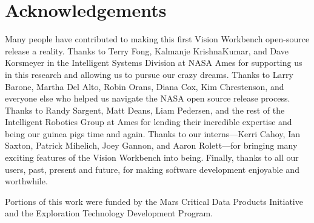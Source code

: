 \chapter*{Acknowledgements}

Many people have contributed to making this first Vision Workbench
open-source release a reality.  Thanks to Terry Fong, Kalmanje
KrishnaKumar, and Dave Korsmeyer in the Intelligent Systems Division
at NASA Ames for supporting us in this research and allowing us to
pursue our crazy dreams.  Thanks to Larry Barone, Martha Del Alto,
Robin Orans, Diana Cox, Kim Chrestenson, and everyone else who helped us navigate the
NASA open source release process.  Thanks to Randy Sargent, Matt
Deans, Liam Pedersen, and the rest of the Intelligent Robotics Group
at Ames for lending their incredible expertise and being our guinea
pigs time and again.  Thanks to our interns---Kerri Cahoy, Ian Saxton,
Patrick Mihelich, Joey Gannon, and Aaron Rolett---for bringing many
exciting features of the Vision Workbench into being.  Finally, thanks
to all our users, past, present and future, for making software
development enjoyable and worthwhile.

Portions of this work were funded by the Mars Critical Data Products
Initiative and the Exploration Technology Development Program.
